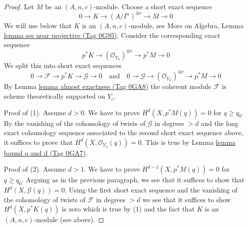 \documentclass{amsart}
\theoremstyle{plain}
\theoremstyle{definition}
\theoremstyle{remark}
\numberwithin{equation}{subsection}
\begin{document}
\begin{proof}
Let $M$ be an $(A, n, c)$-module. Choose a short exact sequence
$$
0 \to K \to (A/I^n)^{\oplus r} \to M \to 0
$$
We will use below that $K$ is an $(A, n, c)$-module, see More on Algebra,
Lemma \href{https://stacks.math.columbia.edu/tag/0G95}{lemma ses near projective (Tag 0G95)}.
Consider the corresponding exact sequence
$$
p^*K \to (\mathcal{O}_{Y_n})^{\oplus r} \to p^*M \to 0
$$
We split this into short exact sequences
$$
0 \to \mathcal{F} \to p^*K \to \mathcal{G} \to 0
\quad\text{and}\quad
0 \to \mathcal{G} \to (\mathcal{O}_{Y_n})^{\oplus r} \to p^*M \to 0
$$
By Lemma \href{https://stacks.math.columbia.edu/tag/0GA8}{lemma almost exactness (Tag 0GA8)} the coherent module $\mathcal{F}$
is scheme theoretically supported on $Y_c$.

\medskip\noindent
Proof of (1). Assume $d > 0$. We have to prove
$H^d(X, p^*M(q)) = 0$ for $q \geq q_0$.
By the vanishing of the cohomology of twists of $\mathcal{G}$ in degrees $> d$
and the long exact cohomology sequence associated to the second
short exact sequence above, it suffices to prove that
$H^d(X, \mathcal{O}_{Y_n}(q)) = 0$.
This is true by Lemma \href{https://stacks.math.columbia.edu/tag/0GA7}{lemma bound q and d (Tag 0GA7)}.

\medskip\noindent
Proof of (2). Assume $d > 1$. We have to prove
$H^{d - 1}(X, p^*M(q)) = 0$ for $q \geq q_0$.
Arguing as in the previous paragraph, we see that it suffices
to show that $H^d(X, \mathcal{G}(q)) = 0$. Using the first
short exact sequence and the vanishing of the cohomology
of twists of $\mathcal{F}$ in degrees $> d$ we see that it suffices
to show $H^d(X, p^*K(q))$ is zero which is
true by (1) and the fact that $K$ is an $(A, n, c)$-module (see above).


\end{proof}
\end{document}
